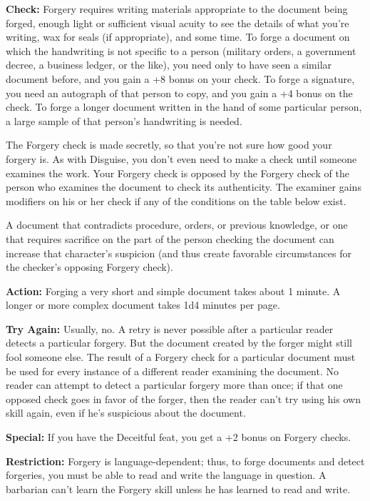 \textbf{Check:} Forgery requires writing materials appropriate to the document being forged, enough light or sufficient visual acuity to see the details of what you’re writing, wax for seals (if appropriate), and some time. To forge a document on which the handwriting is not specific to a person (military orders, a government decree, a business ledger, or the like), you need only to have seen a similar document before, and you gain a +8 bonus on your check. To forge a signature, you need an autograph of that person to copy, and you gain a +4 bonus on the check. To forge a longer document written in the hand of some particular person, a large sample of that person’s handwriting is needed.

The Forgery check is made secretly, so that you’re not sure how good your forgery is. As with Disguise, you don’t even need to make a check until someone examines the work. Your Forgery check is opposed by the Forgery check of the person who examines the document to check its authenticity. The examiner gains modifiers on his or her check if any of the conditions on the table below exist.


A document that contradicts procedure, orders, or previous knowledge, or one that requires sacrifice on the part of the person checking the document can increase that character’s suspicion (and thus create favorable circumstances for the checker’s opposing Forgery check).

\textbf{Action:} Forging a very short and simple document takes about 1 minute. A longer or more complex document takes 1d4 minutes per page.

\textbf{Try Again:} Usually, no. A retry is never possible after a particular reader detects a particular forgery. But the document created by the forger might still fool someone else. The result of a Forgery check for a particular document must be used for every instance of a different reader examining the document. No reader can attempt to detect a particular forgery more than once; if that one opposed check goes in favor of the forger, then the reader can’t try using his own skill again, even if he’s suspicious about the document.

\textbf{Special:} If you have the Deceitful feat, you get a +2 bonus on Forgery checks.

\textbf{Restriction:} Forgery is language-dependent; thus, to forge documents and detect forgeries, you must be able to read and write the language in question. A barbarian can’t learn the Forgery skill unless he has learned to read and write.